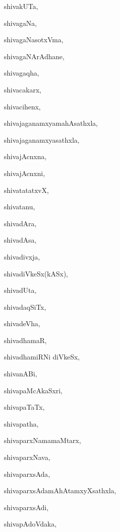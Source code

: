 \begin{multicols}{2}
{shivakUTa}, \pageref{shivakUTa}

{shivagaNa}, \pageref{shivagaNa}

{shivagaNasotxVma}, \pageref{shivagaNasotxVma}

{shivagaNArAdhane}, \pageref{shivagaNArAdhane}

{shivagaqha}, \pageref{shivagaqha}

{shivacakarx}, \pageref{shivacakarx}

{shivacihenx}, \pageref{shivacihenx}

{shivajaganamxyamahAsathxla}, \pageref{shivajaganamxyamahAsathxla}

{shivajaganamxyasathxla}, \pageref{shivajaganamxyasathxla}

{shivajAcnxna}, \pageref{shivajAcnxna}

{shivajAcnxni}, \pageref{shivajAcnxni}

{shivatatatxvX}, \pageref{shivatatatxvX}

{shivatanu}, \pageref{shivatanu}

{shivadAra}, \pageref{shivadAra}

{shivadAsa}, \pageref{shivadAsa}

{shivadivxja}, \pageref{shivadivxja}

{shivadiVkeSx(kASx)}, \pageref{shivadiVkeSxkASx}

{shivadUta}, \pageref{shivadUta}

{shivadaqSiTx}, \pageref{shivadaqSiTx}

{shivadeVha}, \pageref{shivadeVha}

{shivadhamaR}, \pageref{shivadhamaR}

{shivadhamiRNi diVkeSx}, \pageref{shivadhamiRNidiVkeSx}

{shivanABi}, \pageref{shivanABi}

{shivapaMcAkaSxri}, \pageref{shivapaMcAkaSxri}

{shivapaTaTx}, \pageref{shivapaTaTx}

{shivapatha}, \pageref{shivapatha}

{shivaparxNamamaMtarx}, \pageref{shivaparxNamamaMtarx}

{shivaparxNava}, \pageref{shivaparxNava}

{shivaparxsAda}, \pageref{shivaparxsAda}

{shivaparxsAdamAhAtamxyXsathxla}, \pageref{shivaparxsAdamAhAtamxyXsathxla}

{shivaparxsAdi}, \pageref{shivaparxsAdi}

{shivapAdoVdaka}, \pageref{shivapAdoVdaka}


\end{multicols}
